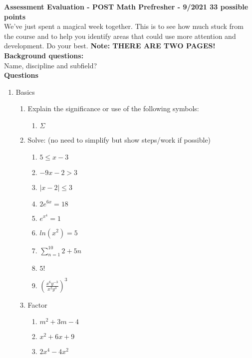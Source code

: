 \documentclass[10pt]{article}
\begin{document}
\noindent\textbf{Assessment Evaluation  - POST Math Prefresher - 9/2021 33 possible points } \\
We've just spent a magical week together. This is to see how much stuck from the course and to help you identify areas that could use more attention and development. Do your best.  \textbf{Note: THERE ARE TWO PAGES!} \\

\noindent \textbf{Background questions:} \\
\indent Name, discipline and subfield? \\

\vspace{3mm}
\noindent \textbf{Questions}

\begin{enumerate}

\item Basics
\begin{enumerate}
\item Explain the significance or use of the following symbols:
\begin{enumerate} 
\item $\Sigma$
\end{enumerate}


\item Solve: (no need to simplify but show steps/work if possible)
\begin{enumerate}
\item $5\leq x-3$ \\
\item $-9x-2>3$ \\
\item $|x-2|\leq3$ \\
\item $2e^{6x}=18$ \\
\item $e^{x^4}=1$ \\
\item $ln(x^2)=5$ \\
\item $\sum_{n=1}^{10} 2+5n $\\
\item $5!$ \\
\item $(\frac{x^6y^{-3}}{x^2y^3})^3$ \\
\end{enumerate}

\item Factor
\begin{enumerate}
\item $m^2+3m-4 $
\item $x^2+6x+9$
\item $2x^4-4x^2$
\end{enumerate}


\end{enumerate}
\end{enumerate}
\end{document}
